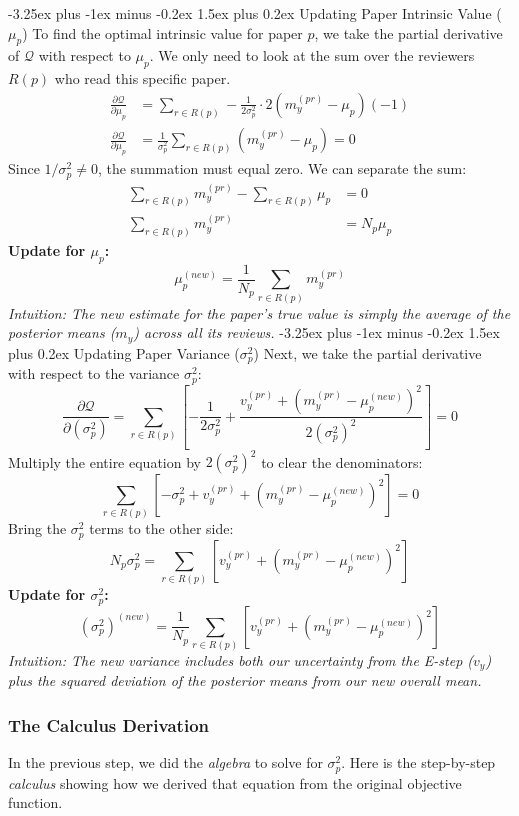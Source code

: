 \documentclass[twoside, 10pt]{article}
\makeatletter
\renewcommand{\paragraph}{\@startsection{paragraph}{4}{0pt}%
    {-3.25ex plus -1ex minus -0.2ex}%
    {1.5ex plus 0.2ex}%
    {\normalfont\normalsize\bfseries}}
\makeatother
\begin{document}
\paragraph{Updating Paper Intrinsic Value ($\mu_p$)}
To find the optimal intrinsic value for paper $p$, we take the partial derivative of $\mathcal{Q}$ with respect to $\mu_p$. We only need to look at the sum over the reviewers $R(p)$ who read this specific paper.
\begin{align*}
\frac{\partial \mathcal{Q}}{\partial \mu_p} &= \sum_{r \in R(p)} -\frac{1}{2\sigma_p^2} \cdot 2(m_y^{(pr)} - \mu_p)(-1) \\
\frac{\partial \mathcal{Q}}{\partial \mu_p} &= \frac{1}{\sigma_p^2} \sum_{r \in R(p)} (m_y^{(pr)} - \mu_p) = 0
\end{align*}
Since $1/\sigma_p^2 \neq 0$, the summation must equal zero. We can separate the sum:
\begin{align*}
\sum_{r \in R(p)} m_y^{(pr)} - \sum_{r \in R(p)} \mu_p &= 0 \\
\sum_{r \in R(p)} m_y^{(pr)} &= N_p \mu_p
\end{align*}
\noindent\textbf{Update for $\mu_p$:}
\[
\mu_p^{(new)} = \frac{1}{N_p} \sum_{r \in R(p)} m_y^{(pr)}
\]
\textit{Intuition: The new estimate for the paper's true value is simply the average of the posterior means ($m_y$) across all its reviews.}
\paragraph{Updating Paper Variance ($\sigma_p^2$)}
Next, we take the partial derivative with respect to the variance $\sigma_p^2$:
\[
\frac{\partial \mathcal{Q}}{\partial (\sigma_p^2)} = \sum_{r \in R(p)} \left[ -\frac{1}{2\sigma_p^2} + \frac{v_y^{(pr)} + (m_y^{(pr)} - \mu_p^{(new)})^2}{2(\sigma_p^2)^2} \right] = 0
\]
Multiply the entire equation by $2(\sigma_p^2)^2$ to clear the denominators:
\[
\sum_{r \in R(p)} \left[ -\sigma_p^2 + v_y^{(pr)} + (m_y^{(pr)} - \mu_p^{(new)})^2 \right] = 0
\]
Bring the $\sigma_p^2$ terms to the other side:
\[
N_p \sigma_p^2 = \sum_{r \in R(p)} \left[ v_y^{(pr)} + (m_y^{(pr)} - \mu_p^{(new)})^2 \right]
\]
\noindent\textbf{Update for $\sigma_p^2$:}
\[
(\sigma_p^2)^{(new)} = \frac{1}{N_p} \sum_{r \in R(p)} \left[ v_y^{(pr)} + (m_y^{(pr)} - \mu_p^{(new)})^2 \right]
\]
\textit{Intuition: The new variance includes both our uncertainty from the E-step ($v_y$) plus the squared deviation of the posterior means from our new overall mean.}
\subsubsection*{The Calculus Derivation}
In the previous step, we did the \textit{algebra} to solve for $\sigma_p^2$. Here is the step-by-step \textit{calculus} showing how we derived that equation from the original objective function.
\end{document}
